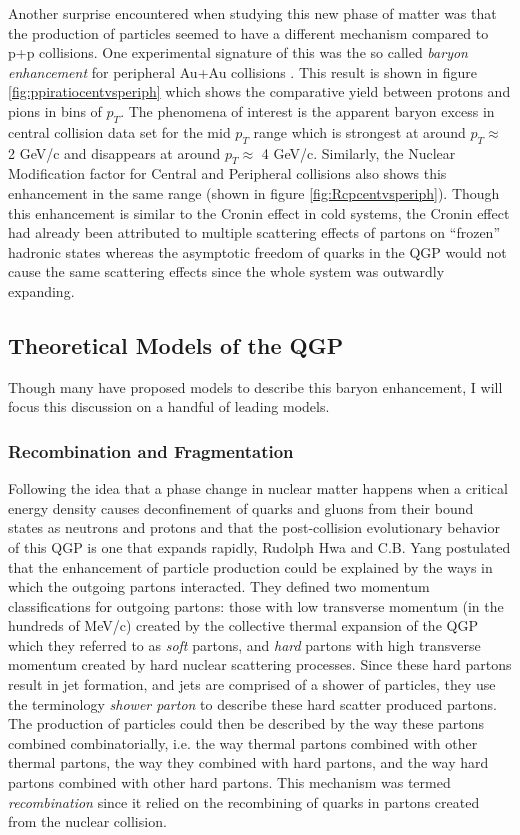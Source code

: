 Another surprise encountered when studying this new phase of matter was that the production of particles seemed to have a different mechanism compared to p+p collisions. One experimental signature of this was the so called \textit{baryon enhancement} for peripheral Au+Au collisions \citep{PhysRevLett.97.152301}. This result is shown in figure \ref{fig:ppiratiocentvsperiph} which shows the comparative yield between protons and pions in bins of $p_{T}$. The phenomena of interest is the apparent baryon excess in central collision data set for the mid $p_{T}$ range which is strongest at around $p_{T}\approx$ 2 GeV/c and disappears at around $p_{T}\approx$ 4 GeV/c. Similarly, the Nuclear Modification factor for Central and Peripheral collisions also shows this enhancement in the same range (shown in figure \ref{fig:Rcpcentvsperiph}). Though this enhancement is similar to the Cronin effect in cold systems, the Cronin effect had already been attributed to multiple scattering effects of partons on ``frozen'' hadronic states whereas the asymptotic freedom of quarks in the QGP would not cause the same scattering effects since the whole system was outwardly expanding.

\subsection{Theoretical Models of the QGP}
Though many have proposed models to describe this baryon enhancement, I will focus this discussion on a handful of leading models.

\subsubsection{Recombination and Fragmentation}
Following the idea that a phase change in nuclear matter happens when a critical energy density causes deconfinement of quarks and gluons from their bound states as neutrons and protons and that the post-collision evolutionary behavior of this QGP is one that expands rapidly, Rudolph Hwa and C.B. Yang postulated that the enhancement of particle production could be explained by the ways in which the outgoing partons interacted\citep{PhysRevC.70.024905}. They defined two momentum classifications for outgoing partons: those with low transverse momentum (in the hundreds of MeV/c) created by the collective thermal expansion of the QGP which they referred to as \textit{soft} partons, and \textit{hard} partons with high transverse momentum created by hard nuclear scattering processes. Since these hard partons result in jet formation, and jets are comprised of a shower of particles, they use the terminology \textit{shower parton} to describe these hard scatter produced partons. The production of particles could then be described by the way these partons combined combinatorially, i.e. the way thermal partons combined with other thermal partons, the way they combined with hard partons, and the way hard partons combined with other hard partons. This mechanism was termed \textit{recombination} since it relied on the recombining of quarks in partons created from the nuclear collision.

